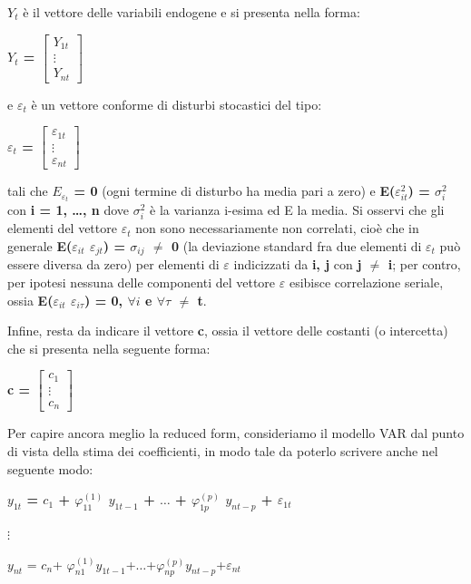 \documentclass[12pt,a4paper,oneside,openright]{book}
\begin{document}
{\bfseries $Y_{t}$} è il vettore delle variabili endogene e si presenta nella forma:
\begin{center}
{\bfseries $Y_{t}$ = $\begin{bmatrix}
Y_{1t}\\ \vdots \\ Y_{nt} 
\end{bmatrix}$ }
\end{center}
e $\varepsilon_{t}$ è un vettore conforme di disturbi stocastici del tipo:
\begin{center}
{\bfseries $\varepsilon_{t}$ = $\begin{bmatrix}
\varepsilon_{1t}\\ \vdots \\ \varepsilon_{nt} 
\end{bmatrix}$ }
\end{center}
tali che {\bfseries $E_{\varepsilon_{t}}$ = 0} (ogni termine di disturbo ha media pari a zero) e {\bfseries E($\varepsilon^2_{it}$) = $\sigma^2_{i}$} con {\bfseries i = 1, \dots, n} dove {\bfseries $\sigma^2_{i}$} è la varianza i-esima ed E la media. Si osservi che gli elementi del vettore $\varepsilon_{t}$ non sono necessariamente non correlati, cioè che in generale {\bfseries E($\varepsilon_{it}$ $\varepsilon_{jt}$) = $\sigma_{ij}$ $\neq$ 0 } (la deviazione standard fra due elementi di $\varepsilon_{t}$ può essere diversa da zero) per elementi di $\varepsilon$ indicizzati da {\bfseries i, j}  con {\bfseries j $\neq$ i}; per contro, per ipotesi nessuna delle componenti del vettore $\varepsilon$ esibisce correlazione seriale, ossia {\bfseries E($\varepsilon_{it}$ $\varepsilon_{i \tau}$) = 0, $\forall{i}$ e $\forall{\tau}$ $\neq$ t}.

Infine, resta da indicare il vettore {\bfseries c}, ossia il vettore delle costanti (o intercetta) che si presenta nella seguente forma: 
\begin{center}
{\bfseries c = 
$\begin{bmatrix}
c_{1} \\ \vdots \\ c_{n}
\end{bmatrix}$  }
\end{center}

Per capire ancora meglio la reduced form, consideriamo il modello VAR dal punto di vista della stima dei coefficienti, in modo tale da poterlo scrivere anche nel seguente modo: 
\begin{center}
{\bfseries
$y_{1t}$ = $c_{1}$ + $\varphi^{(1)}_{11}$ $y_{1t-1}$ + $\dots$ + $\varphi^{(p)}_{1p}$ $y_{nt-p}$ + $\varepsilon_{1t}$ 

$\vdots$

$y_{nt}$ = $c_n$+ $\varphi_{n1}^{(1)}y_{1t-1}$+$\dots$+$\varphi_{np}^{(p)}y_{nt-p}$+$\varepsilon_{nt}$
}
\end{center}
\end{document}
